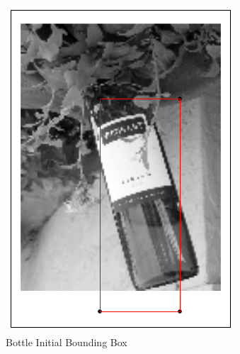 \begin{figure}[h!]
\begin{subfigure}[b]{0.1\textwidth}
            \includegraphics[width=\textwidth]{supports/Segmentation_Measure/bottle}
        \caption{Bottle Initial Bounding Box}
    \end{subfigure}
    \qquad
    \begin{subfigure}[b]{0.1\textwidth}

\end{subfigure}
\end{figure}
